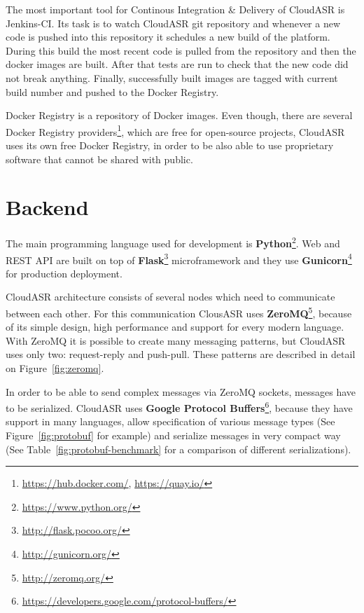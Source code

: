The most important tool for Continous Integration \& Delivery of CloudASR is Jenkins-CI.
Its task is to watch CloudASR git repository
  and whenever a new code is pushed into this repository it schedules a new build of the platform.
During this build the most recent code is pulled from the repository and then the docker images are built.
After that tests are run to check that the new code did not break anything.
Finally, successfully built images are tagged with current build number and pushed to the Docker Registry.


Docker Registry is a repository of Docker images.
Even though, there are several Docker Registry providers\footnote{\url{https://hub.docker.com/}, \url{https://quay.io/}},
  which are free for open-source projects,
  CloudASR uses its own free Docker Registry,
  in order to be also able to use proprietary software that cannot be shared with public.


\section{Backend}
The main programming language used for development is \textbf{Python}\footnote{\url{https://www.python.org/}}.
Web and REST API are built on top of \textbf{Flask}\footnote{\url{http://flask.pocoo.org/}} microframework
  and they use \textbf{Gunicorn}\footnote{\url{http://gunicorn.org/}} for production deployment.

CloudASR architecture consists of several nodes which need to communicate between each other.
For this communication ClousASR uses \textbf{ZeroMQ}\footnote{\url{http://zeromq.org/}},
  because of its simple design, high performance and support for every modern language.
With ZeroMQ it is possible to create many messaging patterns,
  but CloudASR uses only two: request-reply and push-pull.
These patterns are described in detail on Figure~\ref{fig:zeromq}.



In order to be able to send complex messages via ZeroMQ sockets, messages have to be serialized.
CloudASR uses \textbf{Google Protocol Buffers}\footnote{\url{https://developers.google.com/protocol-buffers/}},
  because they have support in many languages,
  allow specification of various message types (See Figure~\ref{fig:protobuf} for example)
  and serialize messages in very compact way
  (See Table~\ref{fig:protobuf-benchmark} for a comparison of different serializations).


